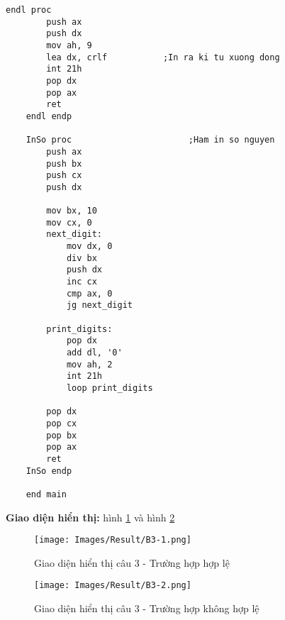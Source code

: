 \begin{lstlisting}[style=asm, caption={Mã nguồn câu 3}]
    endl proc
        push ax
        push dx
        mov ah, 9
        lea dx, crlf           ;In ra ki tu xuong dong
        int 21h
        pop dx
        pop ax
        ret
    endl endp
    
    InSo proc                       ;Ham in so nguyen
        push ax
        push bx
        push cx
        push dx
    
        mov bx, 10
        mov cx, 0
        next_digit:
            mov dx, 0
            div bx
            push dx
            inc cx
            cmp ax, 0
            jg next_digit
    
        print_digits:
            pop dx
            add dl, '0'
            mov ah, 2
            int 21h
            loop print_digits
    
        pop dx
        pop cx
        pop bx
        pop ax
        ret
    InSo endp
    
    end main
\end{lstlisting}

\vspace{0.5cm}
\noindent\textbf{\large Giao diện hiển thị: } hình \ref{fig:result-3-1} và hình \ref{fig:result-3-2}

\begin{figure}[H]
    \centering
    \texttt{[image: Images/Result/B3-1.png]}
    \caption{Giao diện hiển thị câu 3 - Trường hợp hợp lệ}
    \label{fig:result-3-1}
\end{figure}

\begin{figure}[H]
    \centering
    \texttt{[image: Images/Result/B3-2.png]}
    \caption{Giao diện hiển thị câu 3 - Trường hợp không hợp lệ}
    \label{fig:result-3-2}
\end{figure}

